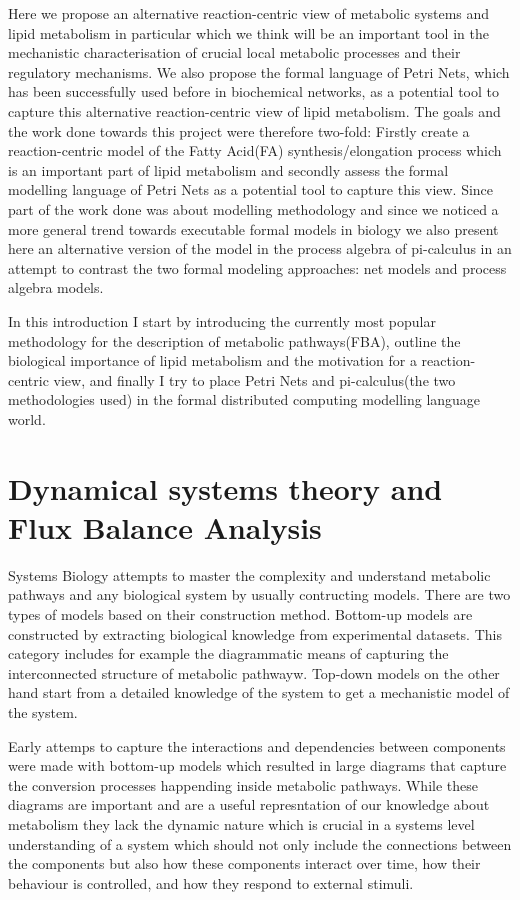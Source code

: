 Here we propose an alternative reaction-centric view of metabolic
systems and lipid metabolism in particular which we think will be an important tool in the mechanistic
characterisation of crucial local metabolic processes and their
regulatory mechanisms. We also propose the formal language of Petri
Nets, which has been successfully used before in biochemical networks,
as a potential tool to capture this alternative reaction-centric view
of lipid metabolism. The goals and the work done towards this project were therefore two-fold:
Firstly create a reaction-centric model of the Fatty Acid(FA)
synthesis/elongation process which is an important part of lipid
metabolism and secondly assess the formal modelling language of Petri
Nets as a potential tool to capture this view. Since part of the work
done was about modelling methodology and since we noticed a more
general trend towards executable formal models in biology we also
present here an alternative version of the model in the process
algebra of  pi-calculus in an attempt to contrast the two formal
modeling approaches: net models and process algebra models.
 
In this introduction I start by introducing the currently most popular
methodology for the description of metabolic pathways(FBA), 
outline the biological importance of lipid metabolism and the
motivation for a reaction-centric view, and finally I try to place
Petri Nets and pi-calculus(the two methodologies used) in the formal
distributed computing modelling language world.

\section{Dynamical systems theory and Flux Balance Analysis}
Systems Biology attempts to master the complexity and understand metabolic
pathways and any biological system by usually contructing
models. There are two types of models based on their construction
method. Bottom-up models are constructed by extracting biological
knowledge from experimental datasets. This category includes for
example the diagrammatic means of capturing the interconnected
structure of metabolic pathwayw. Top-down models on the other hand
start from a detailed knowledge of the system to get a mechanistic
model of the system.

Early attemps to capture the interactions and dependencies between
components were made with bottom-up models which resulted in large diagrams that
capture the conversion processes happending inside metabolic pathways. While these
diagrams are important and are a useful represntation of our knowledge
about metabolism they lack the dynamic nature which is crucial in a
systems level understanding of a system which should not only include
the connections between the components but also how these components
interact over time, how their behaviour is
controlled, and how they respond to external stimuli.

